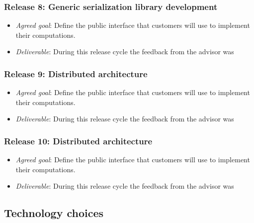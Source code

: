 \subsubsection{Release 8: Generic serialization library development}
\begin{itemize}
\item \textit{Agreed goal}: Define the public interface that customers will
  use to implement their computations.
\item \textit{Deliverable}: During this release cycle the feedback from the advisor
  was
\end{itemize}

\subsubsection{Release 9: Distributed architecture}
\begin{itemize}
\item \textit{Agreed goal}: Define the public interface that customers will
  use to implement their computations.
\item \textit{Deliverable}: During this release cycle the feedback from the advisor
  was
\end{itemize}

\subsubsection{Release 10: Distributed architecture}
\begin{itemize}
\item \textit{Agreed goal}: Define the public interface that customers will
  use to implement their computations.
\item \textit{Deliverable}: During this release cycle the feedback from the advisor
  was
\end{itemize}

\subsection{Technology choices}
\lipsum


